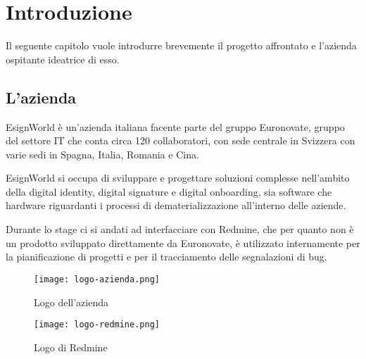 
\chapter{Introduzione}
\label{cap:introduzione}

Il seguente capitolo vuole introdurre brevemente il progetto affrontato e l'azienda ospitante ideatrice di esso. \\



\iffalse
\noindent Esempio di utilizzo di un termine nel glossario \\
\gls{api}. \\
\noindent Esempio di citazione in linea \\
\cite{site:agile-manifesto}. \\
\noindent Esempio di citazione nel pie' di pagina \\
citazione\footcite{womak:lean-thinking} \\
\fi


\section{L'azienda}

\par EsignWorld è un'azienda italiana facente parte del gruppo Euronovate, gruppo del settore IT che conta circa 120 collaboratori, con sede centrale in Svizzera con varie sedi in Spagna, Italia, Romania e Cina. 
\newline
\newline
\par EsignWorld si occupa di sviluppare e progettare soluzioni complesse nell'ambito della digital identity, digital signature e digital onboarding, sia software che hardware riguardanti i processi di dematerializzazione all'interno delle aziende.
\newline
\newline
\par Durante lo stage ci si andati ad interfacciare con Redmine, che per quanto non è un prodotto sviluppato direttamente da Euronovate, è utilizzato internamente per la pianificazione di progetti e per il tracciamento delle segnalazioni di bug.
\newline
\begin{figure}[!h] 
	\centering 
	\texttt{[image: logo-azienda.png]} 
	\caption{Logo dell'azienda}
\end{figure}
\begin{figure}[!h] 
	\centering 
	\texttt{[image: logo-redmine.png]} 
	\caption{Logo di Redmine}
\end{figure}

